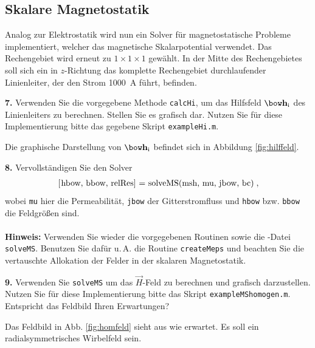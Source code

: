 \documentclass[Protokollheft.tex]{subfiles}
\begin{document}
%
{\subsection{Skalare Magnetostatik}}
Analog zur Elektrostatik wird nun ein Solver für magnetostatische Probleme implementiert, welcher das magnetische Skalarpotential verwendet. Das Rechengebiet wird erneut zu $1\times 1\times 1$ gewählt. In der Mitte des Rechengebietes soll sich ein in $z$-Richtung das komplette Rechengebiet durchlaufender Linienleiter, der den Strom \SI{1000}{A} führt, befinden.

\begin{framed}
	\noindent \textbf{7.} Verwenden Sie die vorgegebene Methode \lstinline{calcHi}, um das Hilfsfeld $\hfit_{\text{i}}$ des Linienleiters zu berechnen.
Stellen Sie es grafisch dar. Nutzen Sie für diese Implementierung bitte das gegebene Skript \lstinline{exampleHi.m}.\label{exer:visualizeHi}
\end{framed}
\noindent
Die graphische Darstellung von $\hfit_{\text{i}}$ befindet sich in Abbildung \ref{fig:hilffeld}.

\begin{framed}
	\noindent \textbf{8.} Vervollständigen Sie den Solver
\begin{align}
\lstinline{[hbow, bbow, relRes] = solveMS(msh, mu, jbow, bc)} \; ,
\end{align}
wobei \lstinline{mu} hier die Permeabilität, \lstinline{jbow} der Gitterstromfluss und
\lstinline{hbow} bzw. \lstinline{bbow} die Feldgrößen sind.\\
\ \\
{\textbf{Hinweis:}} Verwenden Sie wieder die vorgegebenen Routinen sowie die \matlab-Datei \lstinline{solveMS}. Benutzen Sie
dafür u.\,A. die Routine \lstinline{createMeps} und beachten Sie die vertauschte Allokation der Felder in der skalaren Magnetostatik.\label{exer:solveMS}
\end{framed}



\begin{framed}
	\noindent \textbf{9.} Verwenden Sie \lstinline{solveMS} um das $\vec{H}$-Feld zu berechnen und grafisch darzustellen. Nutzen Sie für diese Implementierung bitte das Skript \lstinline{exampleMShomogen.m}. Entspricht das Feldbild Ihren Erwartungen?\label{exer:visualizeHfield}
\end{framed}
\noindent
Das Feldbild in Abb. \ref{fig:homfeld} sieht aus wie erwartet. Es soll ein radialsymmetrisches Wirbelfeld sein.
\end{document}
